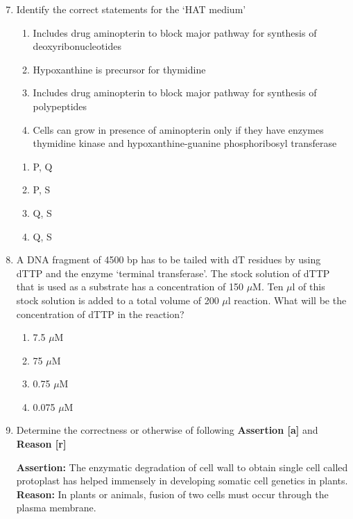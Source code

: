 \documentclass[journal,12pt,onecolumn]{IEEEtran}
\begin{document}
\begin{enumerate}
\setcounter{enumi}{6}
\item Identify the correct statements for the ‘HAT medium’
\begin{enumerate}[label=\Alph*:,start=16]
\item Includes drug aminopterin to block major pathway for synthesis of deoxyribonucleotides  
\item Hypoxanthine is precursor for thymidine  
\item Includes drug aminopterin to block major pathway for synthesis of polypeptides  
\item Cells can grow in presence of aminopterin only if they have enzymes thymidine kinase and hypoxanthine-guanine phosphoribosyl transferase
\end{enumerate}
\begin{multicols}{2}
\begin{enumerate}[label=(\Alph*)]
    \item P, Q
    \item P, S
    \item Q, S
    \item Q, S
\end{enumerate}
\end{multicols}
\item A DNA fragment of 4500 bp has to be tailed with dT residues by using dTTP and the enzyme ‘terminal transferase’. The stock solution of dTTP that is used as a substrate has a concentration of 150 $\mu$M. Ten $\mu$l of this stock solution is added to a total volume of 200 $\mu$l reaction. What will be the concentration of dTTP in the reaction?

\begin{multicols}{2}
\begin{enumerate}[label=(\Alph*)]
    \item 7.5 $\mu$M
    \item 75 $\mu$M
    \item 0.75 $\mu$M
    \item 0.075 $\mu$M
\end{enumerate}
\end{multicols}

\item Determine the correctness or otherwise of following \textbf{Assertion [a]} and \textbf{Reason [r]}  

\textbf{Assertion:} The enzymatic degradation of cell wall to obtain single cell called protoplast has helped immensely in developing somatic cell genetics in plants.  
\textbf{Reason:} In plants or animals, fusion of two cells must occur through the plasma membrane.


\end{enumerate}
\end{document}
